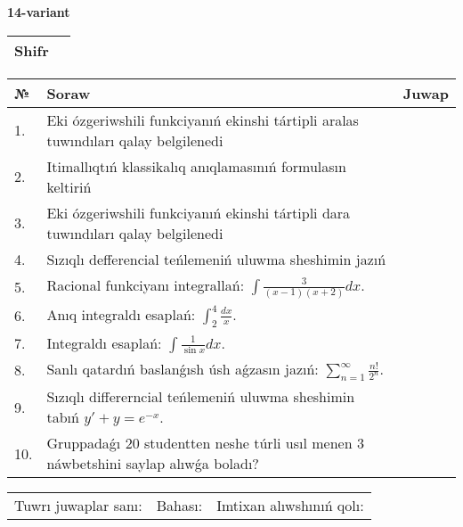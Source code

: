 \documentclass{article}
\begin{document}
  \egroup
  
  \newpage
  
  
  \textbf{14-variant}\\
  
  \bgroup
  \def\arraystretch{1.6} %
  
  \begin{tabular}{|m{5.7cm}|m{9.5cm}|}
  \hline
  Shifr & \\
  \hline
  \end{tabular}
  
  \vspace{1cm}
  
  \begin{tabular}{|m{0.7cm}|m{10cm}|m{4cm}|}
  \hline
  № & Soraw & Juwap \\
  \hline
  1. & Eki ózgeriwshili funkciyanıń ekinshi tártipli aralas tuwındıları qalay belgilenedi &  \\
  \hline
  2. & Itimallıqtıń klassikalıq anıqlamasınıń formulasın keltiriń &  \\
  \hline
  3. & Eki ózgeriwshili funkciyanıń ekinshi tártipli dara tuwındıları qalay belgilenedi &  \\
  \hline
  4. & Sızıqlı defferencial teńlemeniń uluwma sheshimin jazıń &  \\
  \hline
  5. & Racional funkciyanı integrallań: \(\int{\frac{3}{(x - 1)(x + 2)}dx}\). &  \\
  \hline
  6. & Anıq integraldı esaplań: \(\int_{2}^{4}\frac{dx}{x}\). &  \\
  \hline
  7. & Integraldı esaplań: \(\int{\frac{1}{\sin x}dx}\). &  \\
  \hline
  8. & Sanlı qatardıń baslanǵısh úsh aǵzasın jazıń: \(\sum_{n = 1}^{\infty}\frac{n!}{2^{n}}\). &  \\
  \hline
  9. & Sızıqlı differerncial teńlemeniń uluwma sheshimin tabıń \(y' + y = e^{- x}\). &  \\
  \hline
  10. & Gruppadaǵı 20 studentten neshe túrli usıl menen 3 náwbetshini saylap alıwǵa boladı? &  \\
  \hline
  \end{tabular}
  
  \vspace{1cm}
  
  \begin{tabular}{lll}
  Tuwrı juwaplar sanı: \underline{\hspace{1.5cm}} & 
  Bahası: \underline{\hspace{1.5cm}} & 
  Imtixan alıwshınıń qolı: \underline{\hspace{2cm}} \\
  \end{tabular}
  
\end{document}
